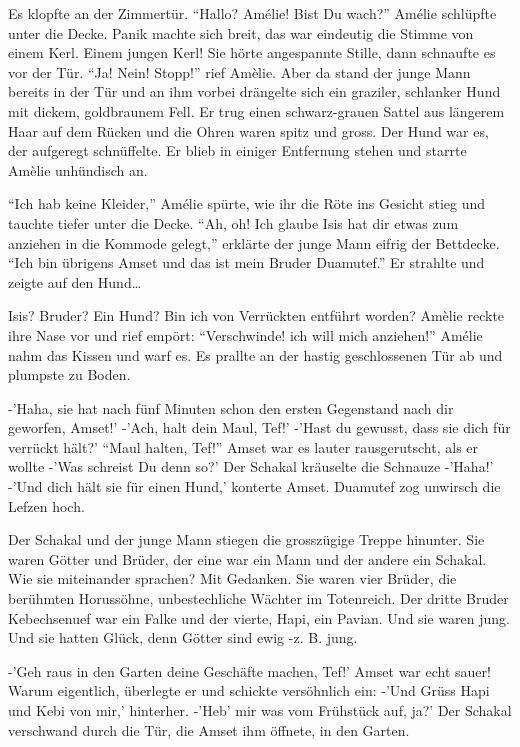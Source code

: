 \documentclass[11pt,titlepage,a5paper]{book}
\begin{document}
Es klopfte an der Zimmertür.
"`Hallo? Amélie! Bist Du wach?"' Amélie schlüpfte unter die Decke. Panik machte sich breit, das war eindeutig die Stimme von einem Kerl. Einem jungen Kerl! Sie hörte angespannte Stille, dann schnaufte es vor der Tür. "`Ja! Nein! Stopp!"' rief Amèlie. Aber da stand der junge Mann bereits in der Tür und an ihm vorbei drängelte sich ein graziler, schlanker Hund mit dickem, goldbraunem Fell. Er trug einen schwarz-grauen Sattel aus längerem Haar auf dem Rücken und die Ohren waren spitz und gross. Der Hund war es, der aufgeregt schnüffelte. Er blieb in einiger Entfernung stehen und starrte Amèlie unhündisch an.

"`Ich hab keine Kleider,"' Amélie spürte, wie ihr die Röte ins Gesicht stieg und tauchte tiefer unter die Decke. "`Ah, oh! Ich glaube Isis hat dir etwas zum anziehen in die Kommode gelegt,"' erklärte der junge Mann eifrig der Bettdecke. "`Ich bin übrigens Amset und das ist mein Bruder Duamutef."' Er strahlte und zeigte auf den Hund\dots

Isis? Bruder? Ein Hund? Bin ich von Verrückten entführt worden? Amèlie reckte ihre Nase vor und rief empört: "`Verschwinde! ich will mich anziehen!"' Amélie nahm das Kissen und warf es. Es prallte an der hastig geschlossenen Tür ab und plumpste zu Boden.

-'Haha, sie hat nach fünf Minuten schon den ersten Gegenstand nach dir geworfen, Amset!' -'Ach, halt dein Maul, Tef!' -'Hast du gewusst, dass sie dich für verrückt hält?' "`Maul halten, Tef!"' Amset war es lauter rausgerutscht, als er wollte -'Was schreist Du denn so?' Der Schakal kräuselte die Schnauze -'Haha!' -'Und dich hält sie für einen Hund,' konterte Amset. Duamutef zog unwirsch die Lefzen hoch.

Der Schakal und der junge Mann stiegen die grosszügige Treppe hinunter. Sie waren Götter und Brüder, der eine war ein Mann und der andere ein Schakal. Wie sie miteinander sprachen? Mit Gedanken. Sie waren vier Brüder, die berühmten Horussöhne, unbestechliche Wächter im Totenreich. Der dritte Bruder Kebechsenuef war ein Falke und der vierte, Hapi, ein Pavian. Und sie waren jung. Und sie hatten Glück, denn Götter sind ewig -z. B. jung.

-'Geh raus in den Garten deine Geschäfte machen, Tef!' Amset war echt sauer! Warum eigentlich, überlegte er und schickte versöhnlich ein: -'Und Grüss Hapi und Kebi von mir,' hinterher. -'Heb' mir was vom Frühstück auf, ja?' Der Schakal verschwand durch die Tür, die Amset ihm öffnete, in den Garten.
\end{document}
